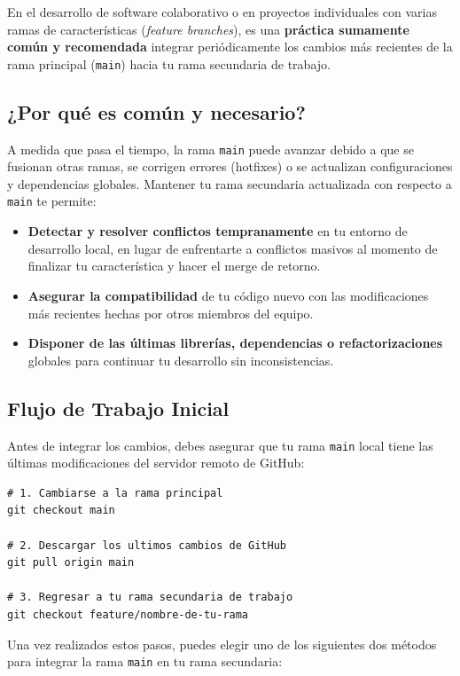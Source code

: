 \documentclass[
10pt, %
a4paper, %
oneside, %
headinclude,footinclude, %
BCOR5mm, %
]{scrartcl}
\begin{document}
En el desarrollo de software colaborativo o en proyectos individuales con varias ramas de características (\textit{feature branches}), es una \textbf{práctica sumamente común y recomendada} integrar periódicamente los cambios más recientes de la rama principal (\texttt{main}) hacia tu rama secundaria de trabajo.

\subsection{¿Por qué es común y necesario?}
A medida que pasa el tiempo, la rama \texttt{main} puede avanzar debido a que se fusionan otras ramas, se corrigen errores (hotfixes) o se actualizan configuraciones y dependencias globales. Mantener tu rama secundaria actualizada con respecto a \texttt{main} te permite:
\begin{itemize}
	\item \textbf{Detectar y resolver conflictos tempranamente} en tu entorno de desarrollo local, en lugar de enfrentarte a conflictos masivos al momento de finalizar tu característica y hacer el merge de retorno.
	\item \textbf{Asegurar la compatibilidad} de tu código nuevo con las modificaciones más recientes hechas por otros miembros del equipo.
	\item \textbf{Disponer de las últimas librerías, dependencias o refactorizaciones} globales para continuar tu desarrollo sin inconsistencias.
\end{itemize}

\subsection{Flujo de Trabajo Inicial}
Antes de integrar los cambios, debes asegurar que tu rama \texttt{main} local tiene las últimas modificaciones del servidor remoto de GitHub:

\begin{lstlisting}[language=DOS]
# 1. Cambiarse a la rama principal
git checkout main

# 2. Descargar los ultimos cambios de GitHub
git pull origin main

# 3. Regresar a tu rama secundaria de trabajo
git checkout feature/nombre-de-tu-rama
\end{lstlisting}

Una vez realizados estos pasos, puedes elegir uno de los siguientes dos métodos para integrar la rama \texttt{main} en tu rama secundaria:
\end{document}
